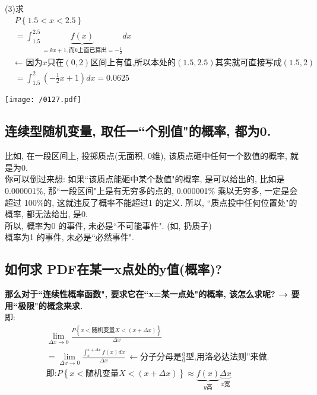\documentclass[UTF8]{ctexart}
\begin{document}
\begin{myEnvSample}
		
		
		(3)求 
		\begin{align*}  %
			&	P\left\{ 1.5<x<2.5 \right\} \\
			&=\int_{1.5}^{2.5}{\underset{=kx+1,\text{而}k\text{上面已算出}=-\frac{1}{2}}{\underbrace{f\left( x \right) }}}dx\\
			&	\text{← 因为}x\text{只在}\left( 0,2 \right) \text{区间上有值,所以本处的}\left( 1.5,2.5 \right) \text{其实就可直接写成}\left( 1.5,2 \right)\\
			&	=\int_{1.5}^2{\left( -\frac{1}{2}x+1 \right)}dx=0.0625
		\end{align*}
		
		\texttt{[image: /0127.pdf]}
		
		
	\end{myEnvSample}
	
	
	
	
	\subsection{连续型随机变量, 取任一``个别值"的概率, 都为0.}
	
	比如, 在一段区间上, 投掷质点(无面积, 0维), 该质点砸中任何一个数值的概率, 就是为0. \\
	你可以倒过来想: 如果``该质点能砸中某个数值"的概率, 是可以给出的, 比如是 0.000001\%, 那``一段区间"上是有无穷多的点的, 0.000001\% 乘以无穷多, 一定是会超过 100\%的, 这就违反了概率不能超过1 的定义. 所以, ``质点投中任何位置处"的概率, 都无法给出, 是0. \\
	
	所以, 概率为0 的事件, 未必是``不可能事件". (如, 扔质子)  \\
	概率为1 的事件, 未必是``必然事件". 
	
	
	
	
	\subsection{如何求 PDF在某一x点处的y值(概率)?}
	
	
	\textbf{那么对于``连续性概率函数", 要求它在``x=某一点处"的概率, 该怎么求呢?  → 要用``极限"的概念来求.} \\
	
	即: 
	\begin{align*}  %
		&\lim_{\varDelta x\rightarrow 0}\frac{P\left\{ x<\text{随机变量}X<\left( x+\varDelta x \right) \right\}}{\varDelta x}\\
		&=\lim_{\varDelta x\rightarrow 0}\frac{\int_x^{x+\varDelta x}{f\left( x \right)}dx}{\varDelta x}\ \gets \text{分子分母是}\frac{0}{0}\text{型,用} \text{洛必达法则}\text{来做}.\\
		&\text{即:}P\left\{ x<\text{随机变量}X<\left( x+\varDelta x \right) \right\} \approx \underset{y\text{高}}{\underbrace{f\left( x \right) }}\underset{x\text{宽}}{\underbrace{\varDelta x}}  
	\end{align*}
	
\end{document}
